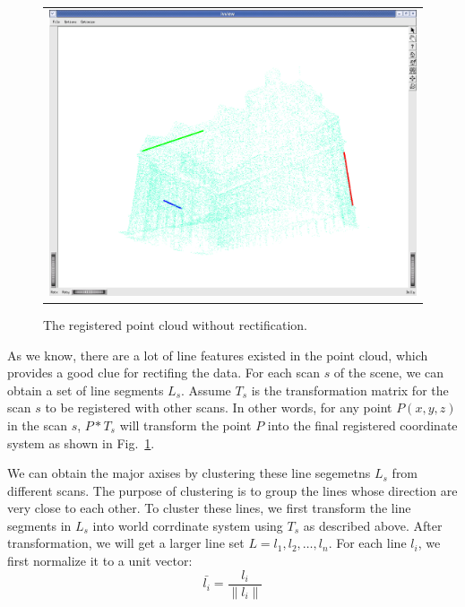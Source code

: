 \documentclass[12pt,letterpaper]{article}
\newcommand{\Fig}[1]{Fig.~\ref{fig:#1}}
\begin{document}
\begin{figure}[htbp]
\begin{center}
\begin{tabular}{c}
\includegraphics[width=\textwidth]{point_cloud_not_rect.png}
\end{tabular}
\end{center}
\caption{ The registered point cloud without rectification. }
\label{fig:pc_orig}
\end{figure}

As we know, there are a lot of line features existed in the point cloud, which
provides a good clue for rectifing the data. 
For each scan $s$ of the scene, we can obtain a set of line segments $L_s$. 
Assume $T_s$ is the transformation matrix for the scan $s$ to be registered with other scans.
In other words, for any point $P(x,y,z)$ in the scan $s$, $P*T_s$ will transform the
point $P$ into the final registered coordinate system as shown in \Fig{pc_orig}.

We can obtain the major axises by clustering these line segemetns $L_s$ from different
scans. The purpose of clustering is to group the lines whose direction are very close to each other.
To cluster these lines, we first transform the line segments in $L_s$ into world
corrdinate system using $T_s$ as described above. After transformation, we will
get a larger line set $L = {l_1, l_2, \ldots, l_n}$. For each line $l_i$, we first
normalize it to a unit vector:
\begin{equation*}
\bar{l_i} = \frac{l_i}{\parallel l_i \parallel}
\end{equation*}
\end{document}

